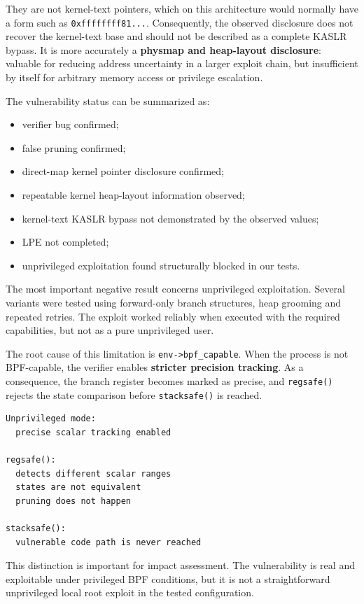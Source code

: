 \documentclass[../main.tex]{subfiles}
\begin{document}
They are not kernel-text pointers, which on this architecture would normally have a form such as \texttt{0xffffffff81...}. Consequently, the observed disclosure does not recover the kernel-text base and should not be described as a complete KASLR bypass. It is more accurately a \textbf{physmap and heap-layout disclosure}: valuable for reducing address uncertainty in a larger exploit chain, but insufficient by itself for arbitrary memory access or privilege escalation.

The vulnerability status can be summarized as:

\begin{itemize}
    \item verifier bug confirmed;
    \item false pruning confirmed;
    \item direct-map kernel pointer disclosure confirmed;
    \item repeatable kernel heap-layout information observed;
    \item kernel-text KASLR bypass not demonstrated by the observed values;
    \item LPE not completed;
    \item unprivileged exploitation found structurally blocked in our tests.
\end{itemize}

The most important negative result concerns unprivileged exploitation. Several variants were tested using forward-only branch structures, heap grooming and repeated retries. The exploit worked reliably when executed with the required capabilities, but not as a pure unprivileged user.

The root cause of this limitation is \texttt{env->bpf\_capable}. When the process is not BPF-capable, the verifier enables \textbf{stricter precision tracking}. As a consequence, the branch register becomes marked as precise, and \texttt{regsafe()} rejects the state comparison before \texttt{stacksafe()} is reached.

\begin{lstlisting}[caption={Unprivileged failure point.}]
Unprivileged mode:
  precise scalar tracking enabled

regsafe():
  detects different scalar ranges
  states are not equivalent
  pruning does not happen

stacksafe():
  vulnerable code path is never reached
\end{lstlisting}

This distinction is important for impact assessment. The vulnerability is real and exploitable under privileged BPF conditions, but it is not a straightforward unprivileged local root exploit in the tested configuration.
\end{document}
